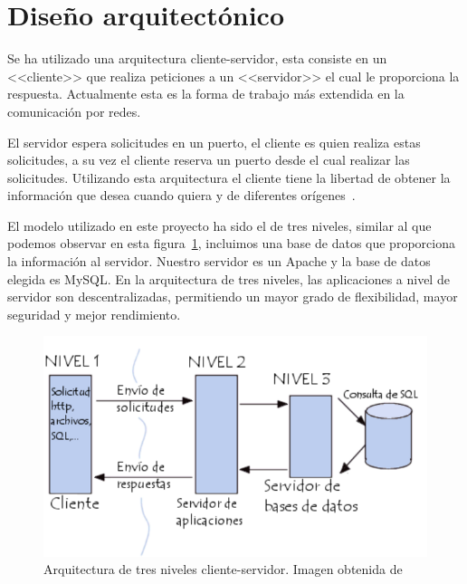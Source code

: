 \section{Diseño arquitectónico}
Se ha utilizado una arquitectura cliente-servidor, esta consiste en un <<cliente>> que realiza peticiones a un <<servidor>> el cual le proporciona la respuesta. Actualmente esta es la forma de trabajo más extendida en la comunicación por redes.

El servidor espera solicitudes en un puerto, el cliente es quien realiza estas solicitudes, a su vez el cliente reserva un puerto desde el cual realizar las solicitudes. Utilizando esta arquitectura el cliente tiene la libertad de obtener la información que desea cuando quiera y de diferentes orígenes~\cite{cliente_servidor}.

El modelo utilizado en este proyecto ha sido el de tres niveles, similar al que podemos observar en esta figura~\ref{fig:CliSer}, incluimos una base de datos que proporciona la información al servidor. Nuestro servidor es un Apache y  la base de datos elegida es MySQL. En la arquitectura de tres niveles, las aplicaciones a nivel de servidor son descentralizadas, permitiendo un mayor grado de flexibilidad, mayor seguridad y mejor rendimiento.

\begin{figure}
\centering
\includegraphics[width=.9\textwidth]{img/cliente_servidor}
\caption[Arquitectura de tres niveles cliente-servidor]{Arquitectura de tres niveles cliente-servidor. Imagen obtenida de \cite{imagen_cli_ser}}
\label{fig:CliSer}
\end{figure}



